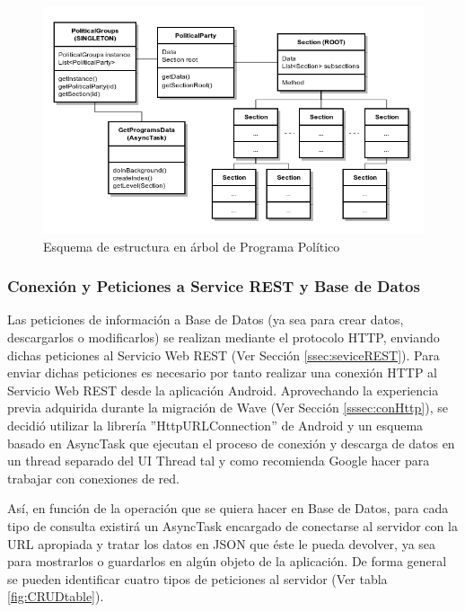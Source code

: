 	\begin{figure}[H]
	  \centering
	    \includegraphics[keepaspectratio, scale=0.6]{Media/Diagrams/classSectionTree.png}
	  \caption{Esquema de estructura en árbol de Programa Político}
	  \label{fig:classSecTree}
	\end{figure}	
	
	\subsubsection{Conexión y Peticiones a Service REST y Base de Datos}

		Las peticiones de información a Base de Datos (ya sea para crear datos, descargarlos o modificarlos) se realizan mediante el protocolo HTTP, enviando dichas peticiones al Servicio Web REST (Ver Sección \ref{ssec:seviceREST}). Para enviar dichas peticiones es necesario por tanto realizar una conexión HTTP al Servicio Web REST desde la aplicación Android. Aprovechando la experiencia previa adquirida durante la migración de Wave (Ver Sección \ref{sssec:conHttp}), se decidió utilizar la librería ''HttpURLConnection'' de Android y un esquema basado en AsyncTask que ejecutan el proceso de conexión y descarga de datos en un thread separado del UI Thread tal y como recomienda Google hacer para trabajar con conexiones de red\cite{ref:android_networking}.
		
		Así, en función de la operación que se quiera hacer en Base de Datos, para cada tipo de consulta existirá un AsyncTask encargado de conectarse al servidor con la URL apropiada y tratar los datos en JSON que éste le pueda devolver, ya sea para mostrarlos o guardarlos en algún objeto de la aplicación. De forma general se pueden identificar cuatro tipos de peticiones al servidor (Ver tabla \ref{fig:CRUDtable}).

